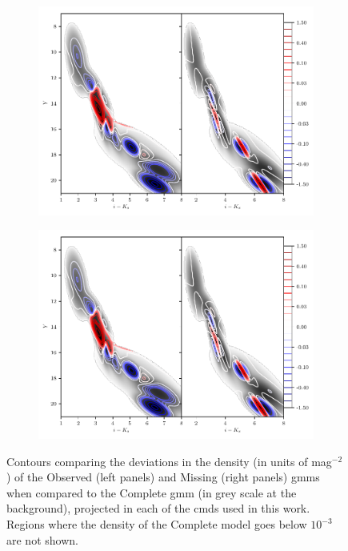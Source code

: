 \begin{figure}[ht!]
\begin{center}
\begin{subfigure}[t]{0.47\textwidth}
\includegraphics[page=3,width=\textwidth]{./background/Figures/validationMissing.pdf}
\end{subfigure}
\begin{subfigure}[t]{0.47\textwidth}
\includegraphics[page=4,width=\textwidth]{./background/Figures/validationMissing.pdf}
\end{subfigure}
\caption{Contours comparing the deviations in the density (in units of mag$^{-2}$) of the Observed (left panels) and Missing (right panels) \glspl{gmm} when compared to the Complete \gls{gmm} (in grey scale at the background), projected in each of the \glspl{cmd} used in this work.  Regions where the density of the Complete model goes below $10^{-3}$ are not shown.}
\label{fig:ignorable_and_naive}
\end{center}
\end{figure}



